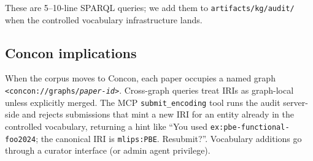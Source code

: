 These are 5--10-line SPARQL queries; we add them to
\texttt{artifacts/kg/audit/} when the controlled vocabulary
infrastructure lands.

\subsection{Concon implications}

When the corpus moves to Concon, each paper occupies a named graph
\texttt{<concon://graphs/\textit{paper-id}>}. Cross-graph queries
treat IRIs as graph-local unless explicitly merged. The MCP
\texttt{submit\_encoding} tool runs the audit server-side and
rejects submissions that mint a new IRI for an entity already in
the controlled vocabulary, returning a hint like ``You used
\texttt{ex:pbe-functional-foo2024}; the canonical IRI is
\texttt{mlips:PBE}. Resubmit?''. Vocabulary additions go through a
curator interface (or admin agent privilege).

